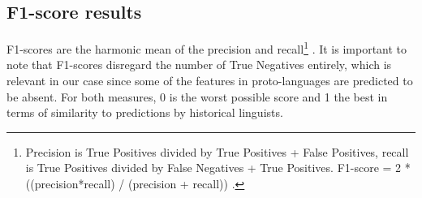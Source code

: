 \documentclass[12pt,letterpaper]{article}
\begin{document}
%
%
%
%
%
%
%

\FloatBarrier


\subsection{F1-score results}
\label{f1_results}

F1-scores are the harmonic mean of the precision and recall\footnote{Precision is True Positives divided by True Positives + False Positives, recall is True Positives divided by False Negatives + True Positives. F1-score = 2 * ((precision*recall) / (precision + recall)) \citep{van1979information}.} \citep[133]{van1979information}. It is important to note that F1-scores disregard the number of True Negatives entirely, which is relevant in our case since some of the features in proto-languages are predicted to be absent. For both measures, 0 is the worst possible score and 1 the best in terms of similarity to predictions by historical linguists. 
\end{document}
